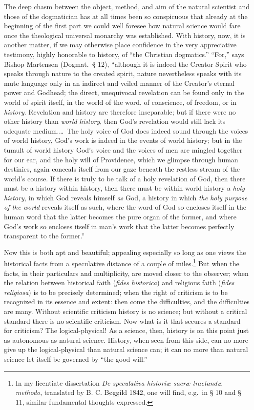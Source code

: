 \documentclass[12pt]{book}
\newcommand{\opage}[1]{\marginnote{\footnotesize\textit{[#1]}}}
\begin{document}
The deep chasm between the object, method, and aim of the natural scientist and those of the dogmatician has at all times been so conspicuous that already at the beginning of the first part we could well foresee how natural science would fare once the theological universal monarchy was established. With history, now, it is another matter, if we may otherwise place confidence in the very appreciative testimony, highly honorable to history, of ``the Christian dogmatics.'' ``For,'' says Bishop Martensen (Dogmat.\ § 12), ``although it is indeed the Creator Spirit who speaks through nature to the created spirit, nature nevertheless speaks with its mute language only in an indirect and veiled manner of the Creator's eternal power and Godhead; the direct, unequivocal revelation can be found only in the world of spirit itself, in the world of the word, of conscience, of freedom, or in \emph{history}. Revelation and history are therefore inseparable; but if there were no other history than \emph{world history}, then God's revelation would still lack its adequate medium.\dots\ The holy voice of God does indeed sound through the voices of world history, God's work is indeed in the events of world history; but in the tumult of world history God's voice and the voices of men are mingled together for our ear, and the holy will of Providence, which we glimpse through human destinies, again conceals itself from our gaze beneath the restless stream of the world's course. If there is truly to be talk of a holy revelation of God, then there must be a history within history, then there must be within world history a \emph{holy history}, in which God reveals himself \emph{as} God, a history in which \emph{the holy purpose of the world} reveals itself as such, where the word of God so encloses itself in the human word that the latter becomes
\opage{41}\setcounter{footnote}{0}%
the pure organ of the former, and where God's work so encloses itself in man's work that the latter becomes perfectly transparent to the former.''

Now this is both apt and beautiful; appealing especially so long as one views the historical facts from a speculative distance of a couple of miles.\footnote{In my licentiate dissertation \textit{De speculativa historiæ sacræ tractandæ methodo}, translated by B. C. Bøggild 1842, one will find, e.g.\ in § 10 and § 11, similar fundamental thoughts expressed.} But when the facts, in their particulars and multiplicity, are moved closer to the observer; when the relation between historical faith (\textit{fides historica}) and religious faith (\textit{fides religiosa}) is to be precisely determined; when the right of criticism is to be recognized in its essence and extent: then come the difficulties, and the difficulties are many. Without scientific criticism history is no science; but without a critical standard there is no scientific criticism. Now what is it that secures a standard for criticism? The logical-physical! As a science, then, history is on this point just as autonomous as natural science. History, when seen from this side, can no more give up the logical-physical than natural science can; it can no more than natural science let itself be governed by ``the good will.''
\end{document}
